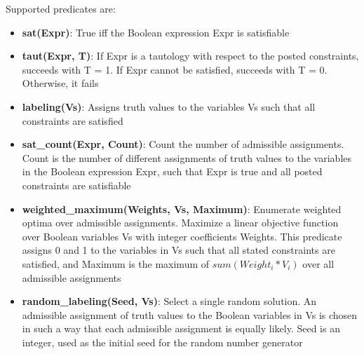 Supported predicates are:
\begin{itemize}
    \item \textbf{sat(Expr)}: True iff the Boolean expression Expr is satisfiable
    \item \textbf{taut(Expr, T)}: If Expr is a tautology with respect to the posted constraints, succeeds with T = 1. If Expr cannot be satisfied, succeeds with T = 0. Otherwise, it fails
    \item \textbf{labeling(Vs)}: Assigns truth values to the variables Vs such that all constraints are satisfied
    \item \textbf{sat\_count(Expr, Count)}: Count the number of admissible assignments. Count is the number of different assignments of truth values to the variables in the Boolean expression Expr, such that Expr is true and all posted constraints are satisfiable
    \item \textbf{weighted\_maximum(Weights, Vs, Maximum)}: Enumerate weighted optima over admissible assignments. Maximize a linear objective function over Boolean variables Vs with integer coefficients Weights. This predicate assigns 0 and 1 to the variables in Vs such that all stated constraints are satisfied, and Maximum is the maximum of $sum(Weight_i*V_i)$ over all admissible assignments
    \item \textbf{random\_labeling(Seed, Vs)}: Select a single random solution. An admissible assignment of truth values to the Boolean variables in Vs is chosen in such a way that each admissible assignment is equally likely. Seed is an integer, used as the initial seed for the random number generator
\end{itemize}


